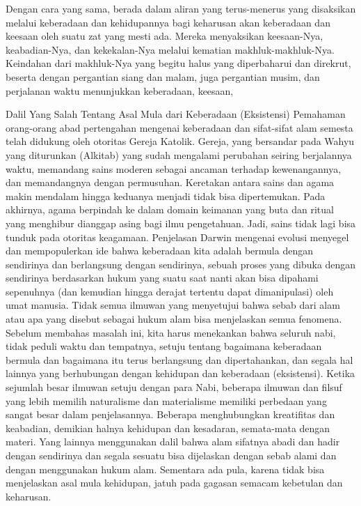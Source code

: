 \documentclass[]{article}
\begin{document}
Dengan cara yang sama, berada dalam aliran yang terus-menerus yang disaksikan melalui keberadaan dan kehidupannya bagi keharusan akan keberadaan dan keesaan oleh suatu zat yang mesti ada. Mereka menyaksikan keesaan-Nya, keabadian-Nya, dan kekekalan-Nya melalui kematian makhluk-makhluk-Nya. Keindahan dari makhluk-Nya yang begitu halus yang diperbaharui dan direkrut, beserta dengan pergantian siang dan malam, juga pergantian musim, dan perjalanan waktu menunjukkan keberadaan,  keesaan, 


Dalil  Yang Salah Tentang Asal Mula dari Keberadaan (Eksistensi)
Pemahaman orang-orang abad pertengahan mengenai keberadaan dan sifat-sifat alam semesta telah didukung oleh otoritas Gereja Katolik. Gereja, yang bersandar pada Wahyu yang diturunkan (Alkitab) yang sudah mengalami perubahan seiring berjalannya waktu, memandang sains moderen sebagai ancaman terhadap kewenangannya, dan memandangnya dengan permusuhan. Keretakan antara sains dan agama makin mendalam hingga keduanya menjadi tidak bisa dipertemukan. Pada akhirnya, agama berpindah ke dalam domain keimanan yang buta dan ritual yang menghibur dianggap asing bagi ilmu pengetahuan. Jadi, sains tidak lagi bisa tunduk pada otoritas keagamaan. Penjelasan Darwin mengenai evolusi menyegel dan mempopulerkan ide bahwa keberadaan kita adalah bermula dengan sendirinya dan berlangsung dengan sendirinya, sebuah proses yang dibuka dengan sendirinya berdasarkan hukum yang suatu saat nanti akan bisa dipahami sepenuhnya (dan kemudian hingga derajat tertentu dapat dimanipulasi) oleh umat manusia. 
Tidak semua ilmuwan yang menyetujui bahwa sebab dari alam atau apa yang disebut sebagai hukum alam bisa menjelaskan semua fenomena. Sebelum membahas masalah ini, kita harus menekankan bahwa seluruh nabi, tidak peduli waktu dan tempatnya, setuju tentang bagaimana keberadaan bermula dan bagaimana itu terus berlangsung dan dipertahankan, dan segala hal lainnya yang berhubungan dengan kehidupan dan keberadaan (eksistensi). Ketika sejumlah besar ilmuwan setuju dengan para Nabi, beberapa ilmuwan dan filsuf yang lebih memilih naturalisme dan materialisme memiliki perbedaan yang sangat besar dalam penjelasannya. Beberapa menghubungkan kreatifitas dan keabadian, demikian halnya kehidupan dan kesadaran, semata-mata dengan materi. Yang lainnya menggunakan dalil bahwa alam sifatnya abadi dan hadir dengan sendirinya dan segala sesuatu bisa dijelaskan dengan sebab alami dan dengan menggunakan hukum alam. Sementara ada pula, karena tidak bisa menjelaskan asal mula kehidupan, jatuh pada gagasan semacam kebetulan dan keharusan. 
\end{document}
